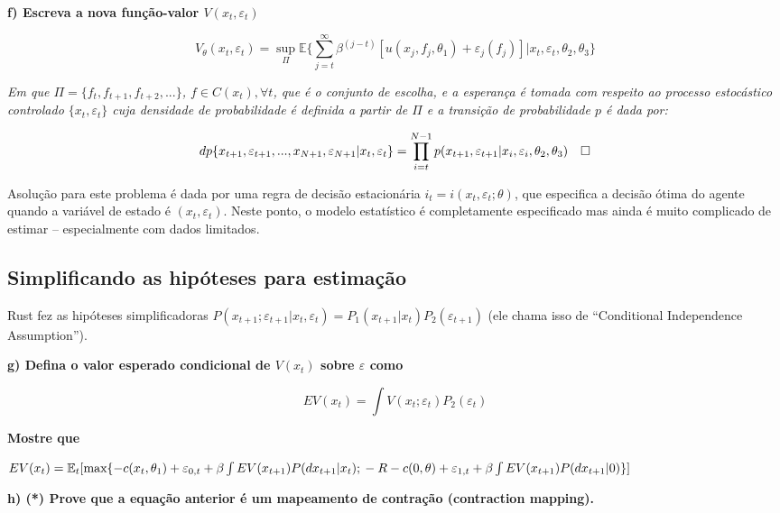 \documentclass[12pt,a4paper]{article}
\begin{document}
\textbf{f) Escreva a nova função-valor \(V(x_t,\varepsilon_t)\)}

\[
V_\theta (x_t,\varepsilon_t) = \sup_\Pi \mathbb{E}\Bigg\{\sum_{j=t}^\infty \beta^{(j-t)}[u(x_j,f_j,\theta_1) + \varepsilon_j(f_j)]|x_t,\varepsilon_t,\theta_2,\theta_3 \Bigg\}
\]

\emph{Em que \(\Pi = \{f_t,f_{t+1},f_{t+2},...\}\),
\(f \in C(x_t), \forall t\), que é o conjunto de escolha, e a esperança
é tomada com respeito ao processo estocástico controlado
\(\{x_t,\varepsilon_t\}\) cuja densidade de probabilidade é definida a
partir de \(\Pi\) e a transição de probabilidade \(p\) é dada por:}

\[
dp\{x_{t+1},\varepsilon_{t+1},...,x_{N+1},\varepsilon_{N+1}|x_t,\varepsilon_t\} \\ = \prod_{i=t}^{N-1}p(x_{t+1},\varepsilon_{t+1}|x_{i},\varepsilon_{i},\theta_2,\theta_3) \quad \square
\]

Asolução para este problema é dada por uma regra de decisão estacionária
\(i_t = i(x_t,\varepsilon_t;\theta)\), que especifica a decisão ótima do
agente quando a variável de estado é \((x_t, \varepsilon_t)\). Neste
ponto, o modelo estatístico é completamente especificado mas ainda é
muito complicado de estimar -- especialmente com dados limitados.

\hypertarget{simplificando-as-hipoteses-para-estimacao}{%
\subsection{Simplificando as hipóteses para
estimação}\label{simplificando-as-hipoteses-para-estimacao}}

Rust fez as hipóteses simplificadoras
\(P (x_{t+1}; \varepsilon_{t+1}| x_t, \varepsilon_t) = P_1 ( x_{t+1}| x_t)P_2(\varepsilon_{t+1})\)
(ele chama isso de ``Conditional Independence Assumption'').

\textbf{g) Defina o valor esperado condicional de \(V(x_t)\) sobre
\(\varepsilon\) como}

\textbf{\[EV(x_t)= \int V(x_t;\varepsilon_t)P_2(\varepsilon_t)\]}

\textbf{Mostre que}

\(EV(x_t)=\mathbb{E}_t[\text{max}\{-c(x_t,\theta_1)+\varepsilon_{0,t} + \beta \int EV(x_{t+1})P(dx_{t+1}|x_t); \\ -R -c(0,\theta) + \varepsilon_{1,t} + \beta \int EV(x_{t+1})P(dx_{t+1}|0)\}]\)

\textbf{h) (*) Prove que a equação anterior é um mapeamento de contração
(contraction mapping).}
\end{document}

